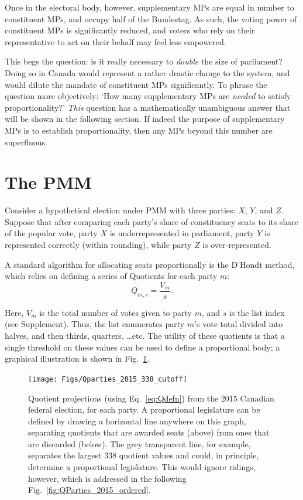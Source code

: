 \documentclass[DIV=calc, paper=a4, fontsize=11pt, twocolumn]{scrartcl}	 %
\begin{document}
Once in the electoral body, however, supplementary MPs are equal in number to constituent MPs, and occupy half of the Bundestag. As such, the voting power of constituent MPs is significantly reduced, and voters who rely on their representative to act on their behalf may feel less empowered.

This begs the question: is it really necessary to \emph{double} the size of parliament? Doing so in Canada would represent a rather drastic change to the system, and would dilute the mandate of constituent MPs significantly. To phrase the question more objectively: `How many supplementary MPs are \emph{needed} to satisfy proportionality?' 
\emph{This} question has a mathematically unambiguous answer that will be shown in the following section. If indeed the purpose of supplementary MPs is to establish proportionality, then any MPs beyond this number are superfluous.

\section{The PMM}
\label{sec:model_proposal}

Consider a hypothetical election under PMM with three parties: $X$, $Y$, and $Z$. Suppose that after comparing each party's share of constituency seats to its share of the popular vote, party $X$ is underrepresented in parliament, party $Y$ is represented correctly (within rounding), while party $Z$ is over-represented. 

A standard algorithm for allocating seats proportionally is the D'Hondt method, which relies on defining a series of Quotients for each party $m$:
\begin{equation}
\label{eq:Qdefn}
Q_{m,s} = \frac{V_m}{s}.
\end{equation}

Here, $V_m$ is the total number of votes given to party $m$, and $s$ is the list index (see Supplement). 
Thus, the list enumerates party $m$'s vote total divided into halves, and then thirds, quarters, \ldots etc. The utility of these quotients is that a single threshold on these values can be used to define a proportional body; a graphical illustration is shown in Fig.~\ref{fig:Qparties_2015_338_cutoff}. 


\begin{figure}[h!]
  \texttt{[image: Figs/Qparties\_2015\_338\_cutoff]}
  \captionsetup{format=default}
  \caption{Quotient projections (using Eq.~\ref{eq:Qdefn}) from the 2015 Canadian federal election, for each party. A proportional legislature can be defined by drawing a horizontal line anywhere on this graph, separating quotients that are awarded seats (above) from ones that are discarded (below). The grey transparent line, for example, separates the largest 338 quotient values and could, in principle, determine a proportional legislature. This would ignore ridings, however, which is addressed in the following Fig.~\ref{fig:QParties_2015_ordered}. }
\label{fig:Qparties_2015_338_cutoff}
\end{figure}
\end{document}
